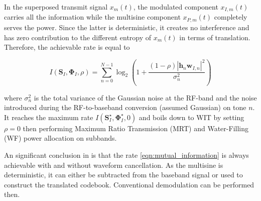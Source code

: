In the superposed transmit signal ${x_m}(t)$, the modulated component ${x_{I,m}}(t)$ carries all the information while the multisine component ${x_{P,m}}(t)$ completely serves the power. Since the latter is deterministic, it creates no interference and has zero contribution to the different entropy of ${x_m}(t)$ in terms of translation. Therefore, the achievable rate is equal to

\begin{equation}\label{eqn:mutual_information}
  I\left( {{{\mathbf{S}}_I},{{\mathbf{\Phi }}_I},\rho } \right) = \sum\limits_{n = 0}^{N - 1} {{{\log }_2}} \left( {1 + \frac{{(1 - \rho ){{\left| {{{\mathbf{h}}_n}{{\mathbf{w}}_{I,n}}} \right|}^2}}}{{\sigma _n^2}}} \right)
\end{equation}

where ${\sigma _n^2}$ is the total variance of the Gaussian noise at the RF-band and the noise introduced during the RF-to-baseband conversion (assumed Gaussian) on tone $n$. It reaches the maximum rate $I\left( {{\mathbf{S}}_I^ \star ,{\mathbf{\Phi }}_I^ \star ,0} \right)$ and boils down to WIT by setting $\rho  = 0$ then performing Maximum Ratio Transmission (MRT) and Water-Filling (WF) power allocation on subbands.

An significant conclusion in \cite{Clerckx2018} is that the rate \ref{eqn:mutual_information} is always achievable with and without waveform cancellation. As the multisine is deterministic, it can either be subtracted from the baseband signal or used to construct the translated codebook. Conventional demodulation can be performed then. 